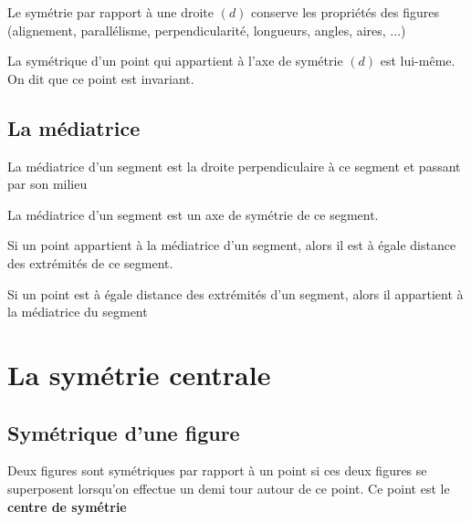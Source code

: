 \documentclass[a4paper,10pt]{report}
\begin{document}
\vspace{-2mm}
\begin{prop}
Le symétrie par rapport à une droite $(d)$ conserve les propriétés des figures (alignement, parallélisme, perpendicularité, longueurs, angles, aires, ...)

\medskip
\noindent La symétrique d'un point qui appartient à l'axe de symétrie $(d)$ est lui-même. On dit que ce point est invariant.
\end{prop}

\vspace{-2mm}
\subsection{La médiatrice}

\begin{defn}
La médiatrice d'un segment est la droite perpendiculaire à ce segment et passant par son milieu
\end{defn}

\begin{rem}

\vspace{-4.5mm} \hspace{3cm}La médiatrice d'un segment est un axe de symétrie de ce segment.
\end{rem}

\begin{prop}
Si un point appartient à la médiatrice d'un segment, alors il est à égale distance des extrémités de ce segment.
\end{prop}

\begin{prop}
Si un point est à égale distance des extrémités d'un segment, alors il appartient à la médiatrice du segment
\end{prop}

\section{La symétrie centrale}

\vspace{-2mm}
\subsection{Symétrique d'une figure}

\vspace{-2mm}
\begin{defn}
Deux figures sont symétriques par rapport à un point si ces deux figures se superposent lorsqu'on effectue un demi tour autour de ce point. Ce point est le \textbf{centre de symétrie}
\end{defn}
\end{document}
